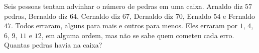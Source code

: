 Seis pessoas tentam advinhar o número de pedras em uma caixa. Arnaldo diz $57$ pedras,
Bernaldo diz $64$, Cernaldo diz $67$, Dernaldo diz $70$, Ernaldo $54$ e Fernaldo $47$. Todos erraram,
alguns para mais e outros para menos. Eles erraram por $1$, $4$, $6$, $9$, $11$ e $12$, em alguma ordem,
mas não se sabe quem cometeu cada erro. Quantas pedras havia na caixa?
